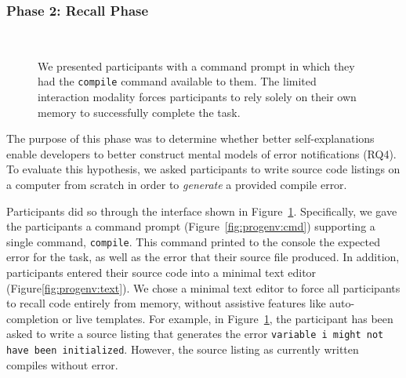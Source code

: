 \documentclass[conference]{IEEEtran}
\begin{document}
\subsubsection{Phase 2: Recall Phase}

\begin{figure}[!t]
  \centering  
  \\
  \caption{We presented participants with a command prompt in which they had the \texttt{compile} command available to them. The limited interaction modality forces participants to rely solely on their own memory to successfully complete the task.\label{fig:progenv}}
\end{figure}

The purpose of this phase was to determine whether better self-explanations enable developers to better construct mental models of error notifications (RQ4). To evaluate this hypothesis, we asked participants to write source code listings on a computer from scratch in order to \textit{generate} a provided compile error. 

Participants did so through the interface shown in Figure~\ref{fig:progenv}. Specifically, we gave the participants a command prompt (Figure~\ref{fig:progenv:cmd}) supporting a single command, \texttt{compile}. This command printed to the console the expected error for the task, as well as the error that their source file produced. In addition, participants entered their source code into a minimal text editor (Figure\ref{fig:progenv:text}). We chose a minimal text editor to force all participants to recall code entirely from memory, without assistive features like auto-completion or live templates. For example, in Figure~\ref{fig:progenv}, the participant has been asked to write a source listing that generates the error \texttt{variable i might not have been initialized}. However, the source listing as currently written compiles without error.
\end{document}
